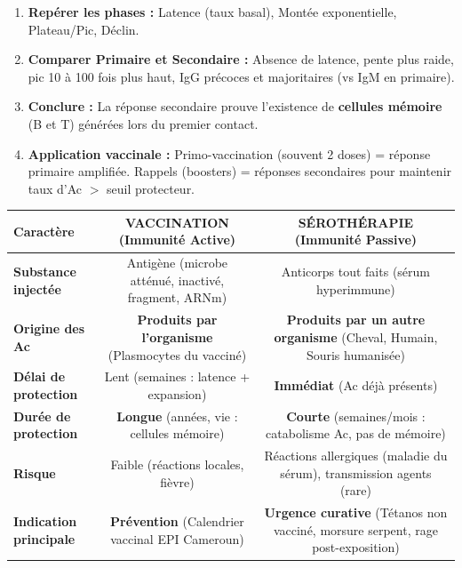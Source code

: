 \documentclass[11pt]{article}
\begin{document}
\begin{methode}
\begin{enumerate}
    \item \textbf{Repérer les phases :} Latence (taux basal), Montée exponentielle, Plateau/Pic, Déclin.
    \item \textbf{Comparer Primaire et Secondaire :} Absence de latence, pente plus raide, pic 10 à 100 fois plus haut, IgG précoces et majoritaires (vs IgM en primaire).
    \item \textbf{Conclure :} La réponse secondaire prouve l'existence de \textbf{cellules mémoire} (B et T) générées lors du premier contact.
    \item \textbf{Application vaccinale :} Primo-vaccination (souvent 2 doses) = réponse primaire amplifiée. Rappels (boosters) = réponses secondaires pour maintenir taux d'Ac $>$ seuil protecteur.
\end{enumerate}
\end{methode}

\begin{exemplebox}
\begin{center}
\begin{tabular}{|l|c|c|}\hline
\textbf{Caractère} & \textbf{VACCINATION (Immunité Active)} & \textbf{SÉROTHÉRAPIE (Immunité Passive)} \\ \hline
\textbf{Substance injectée} & Antigène (microbe atténué, inactivé, fragment, ARNm) & Anticorps tout faits (sérum hyperimmune) \\ \hline
\textbf{Origine des Ac} & \textbf{Produits par l'organisme} (Plasmocytes du vacciné) & \textbf{Produits par un autre organisme} (Cheval, Humain, Souris humanisée) \\ \hline
\textbf{Délai de protection} & Lent (semaines : latence + expansion) & \textbf{Immédiat} (Ac déjà présents) \\ \hline
\textbf{Durée de protection} & \textbf{Longue} (années, vie : cellules mémoire) & \textbf{Courte} (semaines/mois : catabolisme Ac, pas de mémoire) \\ \hline
\textbf{Risque} & Faible (réactions locales, fièvre) & Réactions allergiques (maladie du sérum), transmission agents (rare) \\ \hline
\textbf{Indication principale} & \textbf{Prévention} (Calendrier vaccinal EPI Cameroun) & \textbf{Urgence curative} (Tétanos non vacciné, morsure serpent, rage post-exposition) \\ \hline
\end{tabular}
\end{center}
\end{exemplebox}
\end{document}
